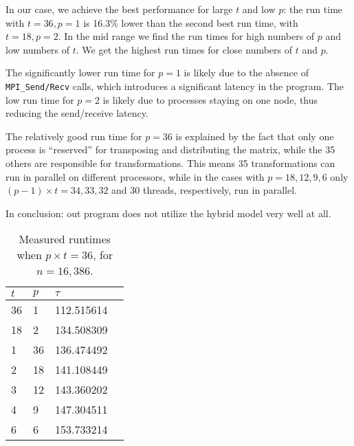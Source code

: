 In our case, we achieve the best performance for large $t$ and low $p$: the run time with $t=36, p=1$ is 16.3\% lower than the second best run time, with $t=18, p=2$. In the mid range we find the run times for high numbers of $p$ and low numbers of $t$. We get the highest run times for close numbers of $t$ and $p$.

The significantly lower run time for $p=1$ is likely due to the absence of \texttt{MPI\_Send/Recv} calls, which introduces a significant latency in the program.
The low run time for $p=2$ is likely due to processes staying on one node, thus reducing the send/receive latency.

The relatively good run time for $p=36$ is explained by the fact that only one process is ``reserved'' for transposing and distributing the matrix, while the 35 others are responsible for transformations. This means 35 transformations can run in parallel on different processors, while in the cases with $p=18,12,9,6$ only $(p-1)\times t = 34, 33, 32$ and $30$ threads, respectively, run in parallel.

In conclusion: out program does not utilize the hybrid model very well at all.

\begin{table}[H]
  \centering
  \caption{Measured runtimes when $p\times t = 36$, for $n=16,386$.}
  \label{tab:runtimes_36}
  \begin{tabularx}{0.5\textwidth}{XXXX}
    \toprule
    $t$ & $p$ & $\tau$ \\
    \midrule
    36  &  1  &  112.515614 \\
    18  &  2  &  134.508309 \\
    1   & 36  &  136.474492 \\
    2   & 18  &  141.108449 \\
    3   & 12  &  143.360202 \\
    4   &  9  &  147.304511 \\
    6   &  6  &  153.733214 \\
    \bottomrule
  \end{tabularx}
\end{table}

